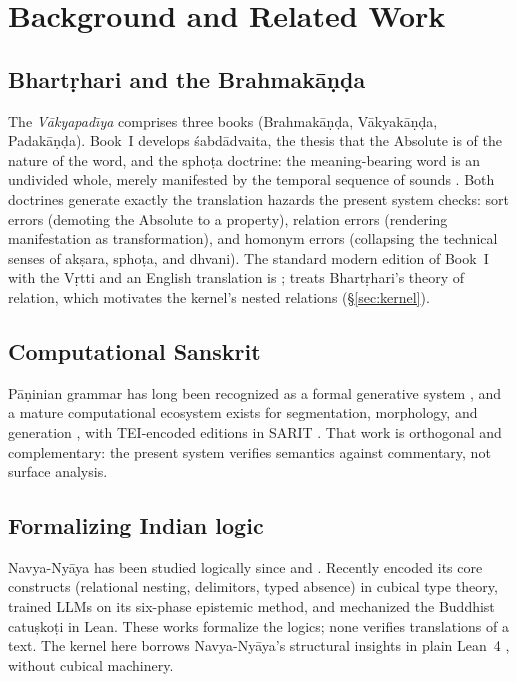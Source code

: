 \documentclass[11pt]{article}
\begin{document}
\section{Background and Related Work}
\label{sec:related}

\subsection{Bhart\d{r}hari and the Brahmak\={a}\d{n}\d{d}a}
The \emph{V\={a}kyapad\={\i}ya} comprises three books
(Brahmak\={a}\d{n}\d{d}a, V\={a}kyak\={a}\d{n}\d{d}a, Padak\={a}\d{n}\d{d}a).
Book~I develops \'sabd\={a}dvaita, the thesis that the Absolute is of the
nature of the word, and the spho\d{t}a doctrine: the meaning-bearing word is
an undivided whole, merely manifested by the temporal sequence of sounds
\citep{coward1980sphota, biardeau1964theorie, staal1969sanskrit}. Both
doctrines generate exactly the translation hazards the present system checks:
sort errors (demoting the Absolute to a property), relation errors (rendering
manifestation as transformation), and homonym errors (collapsing the
technical senses of ak\d{s}ara, spho\d{t}a, and dhvani). The standard modern
edition of Book~I with the V\d{r}tti and an English translation is
\citet{iyer1965vakyapadiya}; \citet{houben1995sambandha} treats
Bhart\d{r}hari's theory of relation, which motivates the kernel's nested
relations (\S\ref{sec:kernel}).

\subsection{Computational Sanskrit}
P\={a}\d{n}inian grammar has long been recognized as a formal generative
system \citep{kiparsky2009panini, cardona1976panini, scharf2009panini}, and a
mature computational ecosystem exists for segmentation, morphology, and
generation \citep{goyal2016samsaadhanii, hellwig2020sanskrit, vidyut}, with
TEI-encoded editions in SARIT \citep{sarit}. That work is orthogonal and
complementary: the present system verifies semantics against commentary, not
surface analysis.

\subsection{Formalizing Indian logic}
Navya-Ny\={a}ya has been studied logically since \citet{ingalls1951materials}
and \citet{matilal1968navya}. Recently \citet{panday2026cubical} encoded its
core constructs (relational nesting, delimitors, typed absence) in cubical
type theory, \citet{sathish2026pramana} trained LLMs on its six-phase
epistemic method, and \citet{diehl2024fourfold} mechanized the Buddhist
catu\d{s}ko\d{t}i in Lean. These works formalize the logics; none verifies
translations of a text. The kernel here borrows Navya-Ny\={a}ya's structural
insights in plain Lean~4 \citep{demoura2021lean4}, without cubical machinery.
\end{document}
